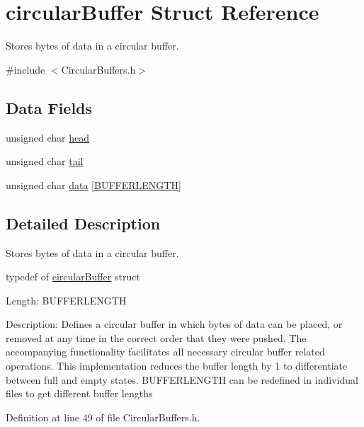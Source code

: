 \hypertarget{structcircular_buffer}{\section{circular\+Buffer Struct Reference}
\label{structcircular_buffer}
}


Stores bytes of data in a circular buffer.  




{\ttfamily \#include $<$Circular\+Buffers.\+h$>$}

\subsection*{Data Fields}
\begin{DoxyCompactItemize}
\item 
unsigned char \hyperlink{structcircular_buffer_a47f7e6109597e5c1c227993c0ce5f560}{head}
\item 
unsigned char \hyperlink{structcircular_buffer_af18a1d7542e277284c4794593b049258}{tail}
\item 
unsigned char \hyperlink{structcircular_buffer_ad7b57ba90694482456be1fbab7de4aec}{data} \mbox{[}\hyperlink{_circular_buffers_8h_a5a69f707d5405fe875b322c6bfbace46}{B\+U\+F\+F\+E\+R\+L\+E\+N\+G\+T\+H}\mbox{]}
\end{DoxyCompactItemize}


\subsection{Detailed Description}
Stores bytes of data in a circular buffer. 



 typedef of \hyperlink{structcircular_buffer}{circular\+Buffer} struct

Length\+: B\+U\+F\+F\+E\+R\+L\+E\+N\+G\+T\+H

Description\+: Defines a circular buffer in which bytes of data can be placed, or removed at any time in the correct order that they were pushed. The accompanying functionality facilitates all necessary circular buffer related operations. This implementation reduces the buffer length by 1 to differentiate between full and empty states. B\+U\+F\+F\+E\+R\+L\+E\+N\+G\+T\+H can be redefined in individual files to get different buffer lengths 

Definition at line 49 of file Circular\+Buffers.\+h.



